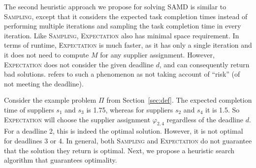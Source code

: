 \documentclass[letterpaper]{article} %
\newcommand{\samd}{\ac{SAMD}\xspace}
\newcommand{\sampling}{\textsc{Sampling}\xspace}
\newcommand{\expectation}{\textsc{Expectation}\xspace}
\begin{document}
The second heuristic approach we propose for solving \samd is
similar to \sampling, except that it considers the expected task completion times instead of performing multiple iterations and sampling the task completion time in every iteration.
Like \sampling, \expectation also has minimal space requirement. In terms of runtime, \expectation is much faster, as it has only a single iteration and it does not need to compute $M$ for any supplier assignment. However, \expectation does not consider the given deadline $d$, and can consequently return bad solutions. \citeauthor{loui1983optimal} refers to such a phenomenon as not taking account of ``risk'' (of not meeting the deadline).

Consider the example problem $\Pi$ from Section~\ref{sec:def}. The expected completion time of suppliers $s_1$ and $s_3$ is 1.75, whereas for suppliers $s_2$ and $s_4$ it is 1.5. So \expectation will choose the supplier assignment $\varphi_{2,4}$ regardless of the deadline $d$. For a deadline 2, this is indeed the optimal solution. However, it is not optimal for deadlines 3 or 4. In general, both \sampling and \expectation do not guarantee that the solution they return is optimal. Next, we propose a heuristic search algorithm that guarantees optimality.







\end{document}
